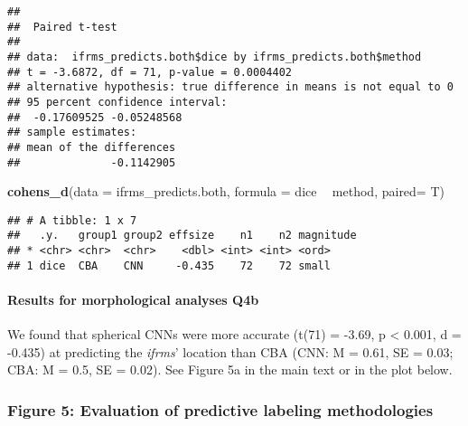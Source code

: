 \documentclass[
]{article}
\newenvironment{Shaded}{\begin{snugshade}}{\end{snugshade}}
\newcommand{\CommentTok}[1]{\textcolor[rgb]{0.56,0.35,0.01}{\textit{#1}}}
\newcommand{\DataTypeTok}[1]{\textcolor[rgb]{0.13,0.29,0.53}{#1}}
\newcommand{\KeywordTok}[1]{\textcolor[rgb]{0.13,0.29,0.53}{\textbf{#1}}}
\newcommand{\NormalTok}[1]{#1}
\newcommand{\OperatorTok}[1]{\textcolor[rgb]{0.81,0.36,0.00}{\textbf{#1}}}
\newcommand{\StringTok}[1]{\textcolor[rgb]{0.31,0.60,0.02}{#1}}
\begin{document}
\begin{verbatim}
## 
##  Paired t-test
## 
## data:  ifrms_predicts.both$dice by ifrms_predicts.both$method
## t = -3.6872, df = 71, p-value = 0.0004402
## alternative hypothesis: true difference in means is not equal to 0
## 95 percent confidence interval:
##  -0.17609525 -0.05248568
## sample estimates:
## mean of the differences 
##              -0.1142905
\end{verbatim}

\begin{Shaded}
\begin{Highlighting}[]
\KeywordTok{cohens_d}\NormalTok{(}\DataTypeTok{data =}\NormalTok{ ifrms_predicts.both,}
         \DataTypeTok{formula =}\NormalTok{ dice }\OperatorTok{~}\StringTok{ }\NormalTok{method, }
         \DataTypeTok{paired=}\NormalTok{ T)}
\end{Highlighting}
\end{Shaded}

\begin{verbatim}
## # A tibble: 1 x 7
##   .y.   group1 group2 effsize    n1    n2 magnitude
## * <chr> <chr>  <chr>    <dbl> <int> <int> <ord>    
## 1 dice  CBA    CNN     -0.435    72    72 small
\end{verbatim}

\hypertarget{results-for-morphological-analyses-q4b}{%
\paragraph{Results for morphological analyses
Q4b}\label{results-for-morphological-analyses-q4b}}

We found that spherical CNNs were more accurate (t(71) = -3.69, p
\textless{} 0.001, d = -0.435) at predicting the \emph{ifrms}' location
than CBA (CNN: M = 0.61, SE = 0.03; CBA: M = 0.5, SE = 0.02). See Figure
5a in the main text or in the plot below.

\hypertarget{figure-5-evaluation-of-predictive-labeling-methodologies}{%
\subsubsection{Figure 5: Evaluation of predictive labeling
methodologies}\label{figure-5-evaluation-of-predictive-labeling-methodologies}}

\begin{Shaded}
\end{Shaded}
\end{document}
